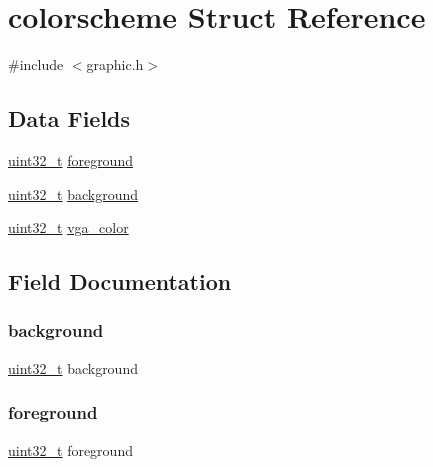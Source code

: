 \hypertarget{structcolorscheme}{}\section{colorscheme Struct Reference}
\label{structcolorscheme}


{\ttfamily \#include $<$graphic.\+h$>$}

\subsection*{Data Fields}
\begin{DoxyCompactItemize}
\item 
\hyperlink{stdint_8h_a324c5d28c0d82f502a234ab99efac87a}{uint32\+\_\+t} \hyperlink{structcolorscheme_a3312c532e19dc8d306df9fbc67900189}{foreground}
\item 
\hyperlink{stdint_8h_a324c5d28c0d82f502a234ab99efac87a}{uint32\+\_\+t} \hyperlink{structcolorscheme_a936176d8851b704dbdd0bb8d1e6bb43b}{background}
\item 
\hyperlink{stdint_8h_a324c5d28c0d82f502a234ab99efac87a}{uint32\+\_\+t} \hyperlink{structcolorscheme_a33d692e7b73597cc66a2fd249c6608c7}{vga\+\_\+color}
\end{DoxyCompactItemize}


\subsection{Field Documentation}
\mbox{\label{structcolorscheme_a936176d8851b704dbdd0bb8d1e6bb43b}} 
\subsubsection{\texorpdfstring{background}{background}}
{\footnotesize\ttfamily \hyperlink{stdint_8h_a324c5d28c0d82f502a234ab99efac87a}{uint32\+\_\+t} background}

\mbox{\label{structcolorscheme_a3312c532e19dc8d306df9fbc67900189}} 
\subsubsection{\texorpdfstring{foreground}{foreground}}
{\footnotesize\ttfamily \hyperlink{stdint_8h_a324c5d28c0d82f502a234ab99efac87a}{uint32\+\_\+t} foreground}

